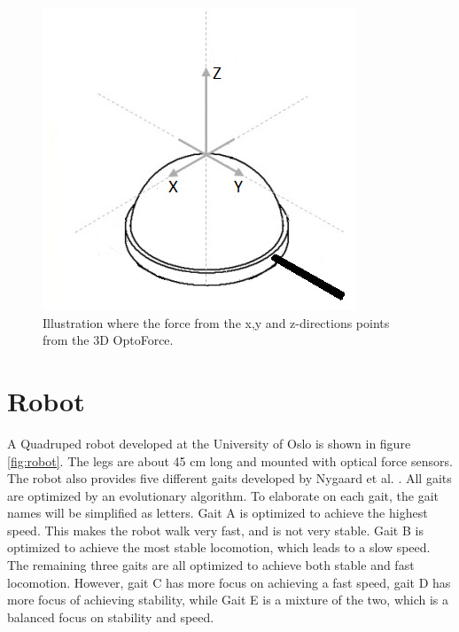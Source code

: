 \documentclass[USenglish]{ifimaster}  %
\begin{document}
\begin{figure}[h]
	\centering
	\includegraphics[scale=0.8]{Figures/OptoforceAxis32}
	\caption[Force directions of the OptoForce sensor]{Illustration where the force from the x,y and z-directions points from the 3D OptoForce.}
	\label{fig:OptoforceAxis}
\end{figure}

\section{Robot} \label{sec:robot}
A Quadruped robot developed at the University of Oslo is shown in figure \ref{fig:robot}. The legs are about 45 cm long and mounted with optical force sensors. The robot also provides five different gaits developed by Nygaard et al. \cite{7850167}. All gaits are optimized by an evolutionary algorithm. To elaborate on each gait, the gait names will be simplified as letters. Gait A is optimized to achieve the highest speed. This makes the robot walk very fast, and is not very stable. Gait B is optimized to achieve the most stable locomotion, which leads to a slow speed. The remaining three gaits are all optimized to achieve both stable and fast locomotion. However, gait C has more focus on achieving a fast speed, gait D has more focus of achieving stability, while Gait E is a mixture of the two, which is a balanced focus on stability and speed.
\end{document}
